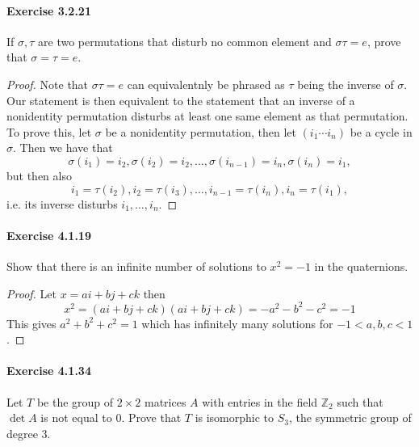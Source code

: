 \documentclass{article}
\begin{document}
\paragraph{Exercise 3.2.21} If $\sigma, \tau$ are two permutations that disturb no common element and $\sigma \tau = e$, prove that $\sigma = \tau = e$.
\begin{proof}
    Note that $\sigma \tau=e$ can equivalentnly be phrased as $\tau$ being the inverse of $\sigma$. Our statement is then equivalent to the statement that an inverse of a nonidentity permutation disturbs at least one same element as that permutation. To prove this, let $\sigma$ be a nonidentity permutation, then let $\left(i_1 \cdots i_n\right)$ be a cycle in $\sigma$. Then we have that
$$
\sigma\left(i_1\right)=i_2, \sigma\left(i_2\right)=i_2, \ldots, \sigma\left(i_{n-1}\right)=i_n, \sigma\left(i_n\right)=i_1,
$$
but then also
$$
i_1=\tau\left(i_2\right), i_2=\tau\left(i_3\right), \ldots, i_{n-1}=\tau\left(i_n\right), i_n=\tau\left(i_1\right),
$$
i.e. its inverse disturbs $i_1, \ldots, i_n$.
\end{proof}



\paragraph{Exercise 4.1.19} Show that there is an infinite number of solutions to $x^2 = -1$ in the quaternions.
\begin{proof}
Let $x=a i+b j+c k$ then
$$
x^2=(a i+b j+c k)(a i+b j+c k)=-a^2-b^2-c^2=-1
$$
This gives $a^2+b^2+c^2=1$ which has infinitely many solutions for $-1<a, b, c<1$.
\end{proof}


\paragraph{Exercise 4.1.34} Let $T$ be the group of $2\times 2$ matrices $A$ with entries in the field $\mathbb{Z}_2$ such that $\det A$ is not equal to 0. Prove that $T$ is isomorphic to $S_3$, the symmetric group of degree 3.
\end{document}
